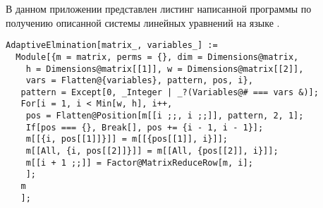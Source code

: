 \documentclass[../main.tex]{subfiles}
\begin{document}
В данном приложении представлен листинг написанной программы по получению описанной системы линейных уравнений на языке .

\begin{lstlisting}
AdaptiveElmination[matrix_, variables_] :=
  Module[{m = matrix, perms = {}, dim = Dimensions@matrix,
    h = Dimensions@matrix[[1]], w = Dimensions@matrix[[2]],
    vars = Flatten@{variables}, pattern, pos, i},
   pattern = Except[0, _Integer | _?(Variables@# === vars &)];
   For[i = 1, i < Min[w, h], i++,
    pos = Flatten@Position[m[[i ;;, i ;;]], pattern, 2, 1];
    If[pos === {}, Break[], pos += {i - 1, i - 1}];
    m[[{i, pos[[1]]}]] = m[[{pos[[1]], i}]];
    m[[All, {i, pos[[2]]}]] = m[[All, {pos[[2]], i}]];
    m[[i + 1 ;;]] = Factor@MatrixReduceRow[m, i];
    ];
   m
   ];
\end{lstlisting}
\end{document}
